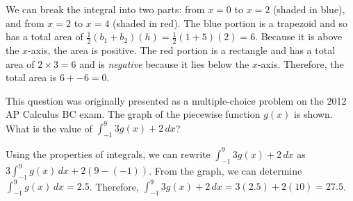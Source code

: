 \begin{Answer}[ref=defint3]
We can break the integral into two parts: from $x = 0$ to $x = 2$ 
(shaded in blue), and from $x = 2$ to $x = 4$ (shaded in red). The 
blue portion is a trapezoid and so has a total area of $\frac{1}{2} 
(b_1 + b_2) (h) = \frac{1}{2} (1 + 5) (2) = 6$. Because it is above 
the $x$-axis, the area is positive. The red portion is a rectangle and 
has a total area of $2 \times 3 = 6$ and is \textit{negative} because 
it lies below the $x$-axis. Therefore, the total area is $6 + -6 = 0$. \\

\end{Answer}

\begin{Exercise}[label=defint4]
	This question was originally presented as a multiple-choice problem 
	on the 2012 AP Calculus BC exam. The graph of the piecewise function 
	$g(x)$ is shown. What is the value of $\int_{-1}^{9} 3 g(x) + 2\,dx$?
	
\end{Exercise}

\begin{Answer}[ref=defint4]
Using the properties of integrals, we can rewrite $\int_{-1}^{9} 3 
g(x) + 2\,dx$ as $3 \int_{-1}^{9} g(x)\,dx + 2 (9-(-1))$. From the 
graph, we can determine $\int_{-1}^{9} g(x)\,dx = 2.5$. Therefore, 
$\int_{-1}^{9} 3 g(x) + 2\,dx = 3 (2.5) + 2 (10) = 27.5$. 
\end{Answer}

